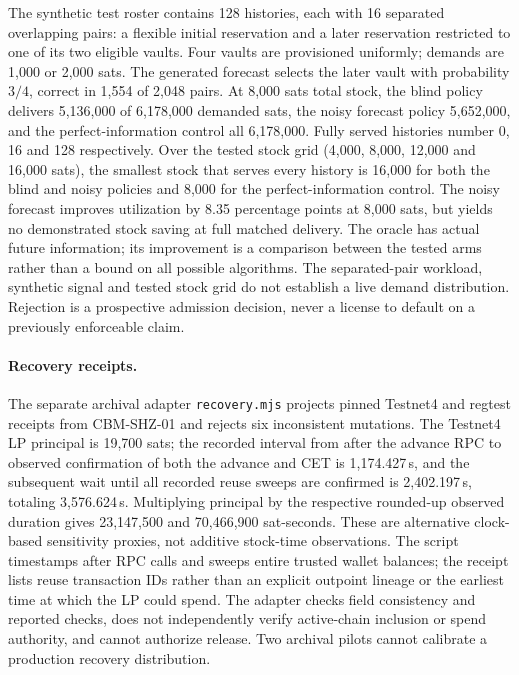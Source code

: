 The synthetic test roster contains 128 histories, each with 16 separated overlapping pairs: a flexible initial reservation and a later reservation restricted to one of its two eligible vaults. Four vaults are provisioned uniformly; demands are 1,000 or 2,000 sats. The generated forecast selects the later vault with probability $3/4$, correct in 1,554 of 2,048 pairs. At 8,000 sats total stock, the blind policy delivers 5,136,000 of 6,178,000 demanded sats, the noisy forecast policy 5,652,000, and the perfect-information control all 6,178,000. Fully served histories number 0, 16 and 128 respectively. Over the tested stock grid (4,000, 8,000, 12,000 and 16,000 sats), the smallest stock that serves every history is 16,000 for both the blind and noisy policies and 8,000 for the perfect-information control. The noisy forecast improves utilization by 8.35 percentage points at 8,000 sats, but yields no demonstrated stock saving at full matched delivery. The oracle has actual future information; its improvement is a comparison between the tested arms rather than a bound on all possible algorithms. The separated-pair workload, synthetic signal and tested stock grid do not establish a live demand distribution. Rejection is a prospective admission decision, never a license to default on a previously enforceable claim.

\paragraph{Recovery receipts.} The separate archival adapter \texttt{recovery.mjs} projects pinned Testnet4 and regtest receipts from CBM-SHZ-01 and rejects six inconsistent mutations. The Testnet4 LP principal is 19,700 sats; the recorded interval from after the advance RPC to observed confirmation of both the advance and CET is 1,174.427\,s, and the subsequent wait until all recorded reuse sweeps are confirmed is 2,402.197\,s, totaling 3,576.624\,s. Multiplying principal by the respective rounded-up observed duration gives 23,147,500 and 70,466,900 sat-seconds. These are alternative clock-based sensitivity proxies, not additive stock-time observations. The script timestamps after RPC calls and sweeps entire trusted wallet balances; the receipt lists reuse transaction IDs rather than an explicit outpoint lineage or the earliest time at which the LP could spend. The adapter checks field consistency and reported checks, does not independently verify active-chain inclusion or spend authority, and cannot authorize release. Two archival pilots cannot calibrate a production recovery distribution.

